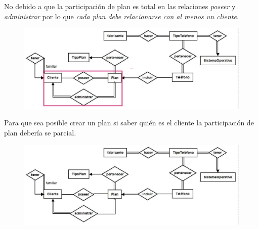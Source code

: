 \documentclass[letterpaper,11pt]{article}
\begin{document}
\begin{itemize}
    No debido a que la participación de plan es total en las relaciones \textit{poseer}
    y \textit{administrar} por lo que \textit{cada plan debe relacionarse con al menos
    un cliente}.
    \begin{figure}[H]
        \centering
        \includegraphics[scale=0.4]{./imagenes/modelo3a.jpg}
    \end{figure}
    Para que sea posible crear un plan si saber quién es el cliente la participación
    de plan debería se parcial.
    \begin{figure}[H]
        \centering
        \includegraphics[scale=0.4]{./imagenes/modelo3b.jpg}
    \end{figure}


\end{itemize}
\end{document}
